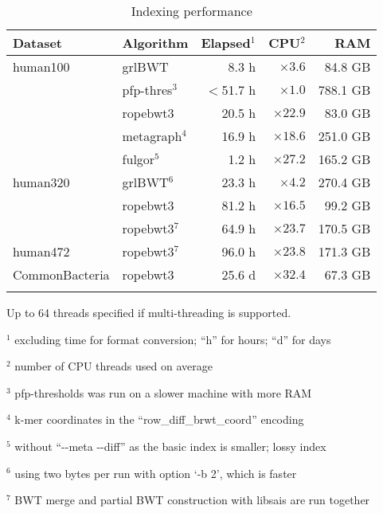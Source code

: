 \documentclass[webpdf,contemporary,large,namedate]{oup-authoring-template}%
\begin{document}
\begin{table}[b]
\caption{Indexing performance\label{tab:index}}
\begin{tabular*}{\columnwidth}{@{\extracolsep\fill}llrrr@{\extracolsep\fill}}
\toprule
Dataset        & Algorithm     & Elapsed$^1$ & CPU$^2$  &      RAM \\
\midrule
human100       & grlBWT        &  8.3 h       &  $\times3.6$ &  84.8 GB \\
		       & pfp-thres$^3$ &$<$51.7 h     &  $\times1.0$ & 788.1 GB \\
               & ropebwt3      & 20.5 h       & $\times22.9$ &  83.0 GB \\
			   & metagraph$^4$ & 16.9 h       & $\times18.6$ & 251.0 GB \\
			   & fulgor$^5$    & 1.2 h        & $\times27.2$ & 165.2 GB \\
human320       & grlBWT$^6$    & 23.3 h       &  $\times4.2$ & 270.4 GB \\
               & ropebwt3      & 81.2 h       & $\times16.5$ &  99.2 GB \\
               & ropebwt3$^7$  & 64.9 h       & $\times23.7$ & 170.5 GB \\
human472       & ropebwt3$^7$  & 96.0 h       & $\times23.8$ & 171.3 GB \\
CommonBacteria & ropebwt3      & 25.6 d       & $\times32.4$ &  67.3 GB \\
\botrule
\end{tabular*}
\begin{tablenotes}\setlength\itemsep{0.0em}
\item Up to 64 threads specified if multi-threading is supported.
\item[$^{1}$] excluding time for format conversion; ``h'' for hours; ``d'' for days
\item[$^{2}$] number of CPU threads used on average
\item[$^{3}$] pfp-thresholds was run on a slower machine with more RAM
\item[$^{4}$] k-mer coordinates in the ``row\_diff\_brwt\_coord'' encoding
\item[$^{5}$] without ``-{}-meta -{}-diff'' as the basic index is smaller; lossy index
\item[$^{6}$] using two bytes per run with option `-b 2', which is faster
\item[$^{7}$] BWT merge and partial BWT construction with libsais are run together
\end{tablenotes}
\end{table}
\end{document}
